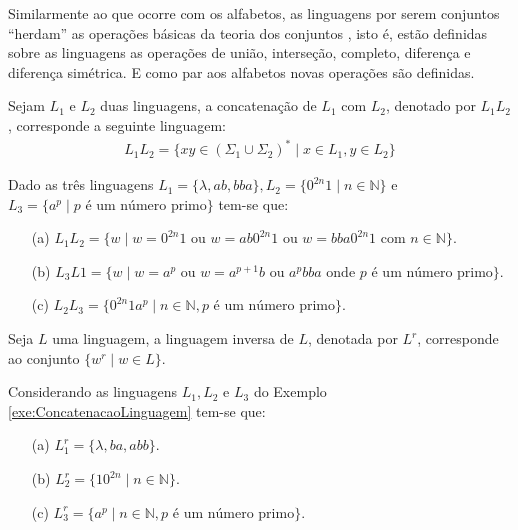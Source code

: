 Similarmente ao que ocorre com os alfabetos, as linguagens por serem conjuntos ``herdam'' as operações básicas da teoria dos conjuntos \cite{lipschutz1978-TC, lipschutz2013-MD, abe1991-TC}, isto é, estão definidas sobre as linguagens as operações de união, interseção, completo, diferença e diferença simétrica. E como par aos alfabetos novas operações são definidas.

\begin{definicao}\label{def:ConcatenacaoLinguagem}
	Sejam $L_1$ e $L_2$ duas linguagens, a concatenação de $L_1$ com $L_2$, denotado por $L_1L_2$, corresponde a seguinte linguagem:
	\begin{eqnarray}
		L_1L_2 = \{xy \in (\Sigma_1 \cup \Sigma_2)^* \mid x \in L_1, y \in L_2\}
	\end{eqnarray}
\end{definicao}

\begin{exemplo}\label{exe:ConcatenacaoLinguagem}
	Dado as três linguagens $L_1 = \{\lambda, ab, bba\}, L_2 =\{0^{2n}1 \mid n \in \mathbb{N}\}$ e $L_3 = \{a^p \mid p \text{ é um número primo}\}$ tem-se que:
	\begin{itemize}
		\item[(a)] $L_1L_2 = \{w \mid w = 0^{2n}1 \text{ ou } w = ab0^{2n}1 \text{ ou } w = bba0^{2n}1 \text{ com } n \in \mathbb{N}\}$.
		\item[(b)] $L_3L1 = \{w \mid w = a^p \text{ ou } w = a^{p+1}b \text{ ou } a^pbba \text{ onde } p \text{ é um número primo}\}$.
		\item[(c)] $L_2L_3 = \{0^{2n}1a^p \mid n \in \mathbb{N}, p \text{ é um número primo}\}$.
	\end{itemize}
\end{exemplo}

\begin{definicao}\label{def:LinguagemReversa}
	Seja $L$ uma linguagem, a linguagem inversa de $L$, denotada por $L^r$, corresponde ao conjunto $\{w^r \mid w \in L\}$.
\end{definicao}

\begin{exemplo}
	Considerando as linguagens $L_1, L_2$ e $L_3$ do Exemplo \ref{exe:ConcatenacaoLinguagem} tem-se que:
	\begin{itemize}
		\item[(a)] $L_1^r = \{\lambda, ba, abb\}$.
		\item[(b)] $L_2^r = \{10^{2n} \mid n \in \mathbb{N}\}$.
		\item[(c)] $L_3^r = \{a^p \mid n \in \mathbb{N}, p \text{ é um número primo}\}$.
	\end{itemize}
\end{exemplo}

